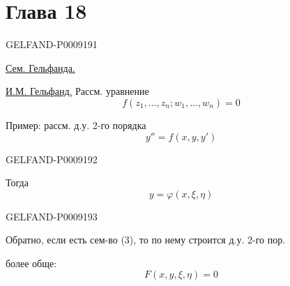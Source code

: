\section*{Глава 18}
\begin{GelfandAdjacentEvidence}{GELFAND-P000919}{1}

\qquad \uline{Сем. Гельфанда.}

\uline{И.М. Гельфанд.} Рассм. уравнение
\begin{equation*}
 f(z_1,\ldots,z_n;w_1,\ldots,w_n)=0
 \tag{1}
\end{equation*}

Пример: рассм. д.у. 2-го порядка
\begin{equation*}
 y''=f(x,y,y')
 \tag{2}
\end{equation*}
\end{GelfandAdjacentEvidence}
\begin{GelfandAdjacentEvidence}{GELFAND-P000919}{2}


Тогда
\begin{equation*}
 y=\varphi(x,\xi,\eta)
 \tag{3}
\end{equation*}
\end{GelfandAdjacentEvidence}
\begin{GelfandAdjacentEvidence}{GELFAND-P000919}{3}


Обратно, если есть сем-во (3), то по нему строится д.у. 2-го пор.

более обще:
\begin{equation*}
 F(x,y,\xi,\eta)=0
 \tag{4}
\end{equation*}
\end{GelfandAdjacentEvidence}
